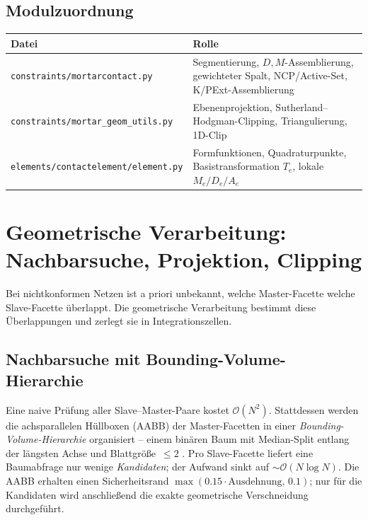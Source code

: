 \documentclass[a4paper,11pt]{article}
\def\bm#1{#1}%
\newcommand{\file}[1]{\texttt{\small #1}}
\let\stdsection\section
\renewcommand{\section}{\clearpage\stdsection}
\begin{document}
\subsection{Modulzuordnung}
\begin{center}
\small
\begin{tabularx}{\linewidth}{lX}
\toprule
Datei & Rolle \\
\midrule
\file{constraints/mortarcontact.py} & Segmentierung, $\bm D,\bm M$-Assemblierung, gewichteter Spalt, NCP/Active-Set, K/PExt-Assemblierung \\
\file{constraints/mortar\_geom\_utils.py} & Ebenenprojektion, Sutherland--Hodgman-Clipping, Triangulierung, 1D-Clip \\
\file{elements/contactelement/element.py} & Formfunktionen, Quadraturpunkte, Basistransformation $\bm T_e$, lokale $\bm M_e/\bm D_e/\bm A_e$ \\
\bottomrule
\end{tabularx}
\end{center}

\section{Geometrische Verarbeitung: Nachbarsuche, Projektion, Clipping}
\label{sec:geometrie}

Bei nichtkonformen Netzen ist a priori unbekannt, welche Master-Facette welche Slave-Facette
überlappt. Die geometrische Verarbeitung bestimmt diese Überlappungen und zerlegt sie in
Integrationszellen.

\subsection{Nachbarsuche mit Bounding-Volume-Hierarchie}
Eine naive Prüfung aller Slave--Master-Paare kostet $\mathcal O(N^2)$. Stattdessen werden die
achsparallelen Hüllboxen (AABB) der Master-Facetten in einer \emph{Bounding-Volume-Hierarchie}
organisiert -- einem binären Baum mit Median-Split entlang der längsten Achse und Blattgröße~$\le2$
\citep{ericson2004}. Pro Slave-Facette liefert eine Baumabfrage nur wenige
\emph{Kandidaten}; der Aufwand sinkt auf $\sim\mathcal O(N\log N)$. Die AABB erhalten einen
Sicherheitsrand $\max(0.15\cdot\text{Ausdehnung},\,0.1)$; nur für die Kandidaten wird anschließend
die exakte geometrische Verschneidung durchgeführt.
\end{document}
